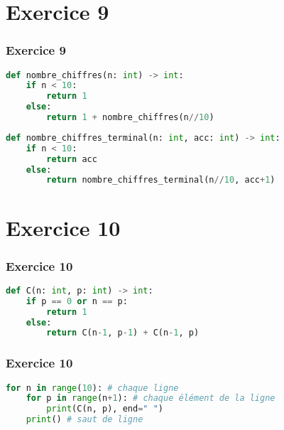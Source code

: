 \documentclass[svgnames,11pt]{beamer}
\begin{document}
\section{Exercice 9}
\begin{frame}[fragile]
    \frametitle{Exercice 9}

\begin{center}
\begin{lstlisting}[language=Python , basicstyle=\ttfamily\small, xleftmargin=2em, xrightmargin=2em]
def nombre_chiffres(n: int) -> int:
    if n < 10:
        return 1
    else:
        return 1 + nombre_chiffres(n//10)
\end{lstlisting}
\label{CODE}
\end{center}

\end{frame}
\begin{frame}[fragile]

\begin{center}
\begin{lstlisting}[language=Python , basicstyle=\ttfamily\small, xleftmargin=2em, xrightmargin=2em]
def nombre_chiffres_terminal(n: int, acc: int) -> int:
    if n < 10:
        return acc
    else:
        return nombre_chiffres_terminal(n//10, acc+1)
\end{lstlisting}
\label{CODE}
\end{center}

\end{frame}
\section{Exercice 10}
\begin{frame}[fragile]
    \frametitle{Exercice 10}

\begin{center}
\begin{lstlisting}[language=Python , basicstyle=\ttfamily\small, xleftmargin=2em, xrightmargin=2em]
def C(n: int, p: int) -> int:
    if p == 0 or n == p:
        return 1
    else:
        return C(n-1, p-1) + C(n-1, p)
\end{lstlisting}
\end{center}

\end{frame}
\begin{frame}[fragile]
    \frametitle{Exercice 10}

\begin{center}
\begin{lstlisting}[language=Python , basicstyle=\ttfamily\small, xleftmargin=2em, xrightmargin=2em]
for n in range(10): # chaque ligne
    for p in range(n+1): # chaque élément de la ligne
        print(C(n, p), end=" ")
    print() # saut de ligne
\end{lstlisting}
\end{center}

\end{frame}
\end{document}
